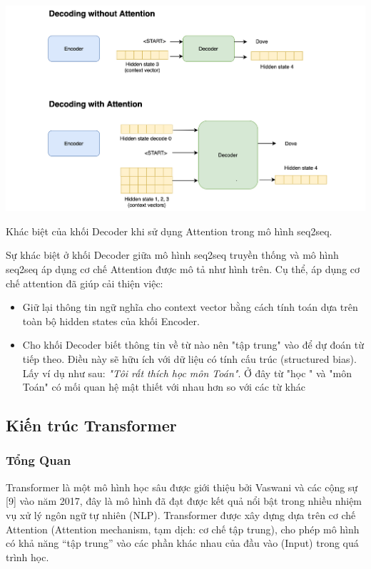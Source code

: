 \documentclass[a4paper, 12pt, openany]{book}
\begin{document}
\begin{minipage}{\linewidth}
    \captionsetup{type=figure}
    \centering
    \includegraphics[width=\linewidth]{./assets/images/decoding-attention.png}
    \caption{Khác biệt của khối Decoder khi sử dụng Attention trong mô hình \ac{seq2seq}.}
\end{minipage}
\vspace{0.5cm}

Sự khác biệt ở khối Decoder giữa mô hình \ac{seq2seq} truyền thống và mô hình \ac{seq2seq} áp dụng cơ chế Attention được mô tả như hình trên.
Cụ thể, áp dụng cơ chế attention đã giúp cải thiện việc:

\begin{itemize}
    \item Giữ lại thông tin ngữ nghĩa cho context vector bằng cách tính toán dựa trên toàn bộ hidden states của khối Encoder.
    \item Cho khối Decoder biết thông tin về từ nào nên "tập trung" vào để dự đoán từ tiếp theo. Điều này sẽ hữu ích với dữ liệu có tính cấu trúc (structured bias). Lấy ví dụ như sau: 
    \textit{"Tôi rất thích học môn Toán"}. Ở đây từ "học " và "môn Toán" có mối quan hệ mật thiết với nhau hơn so với các từ khác
\end{itemize}

\subsection{Kiến trúc Transformer}
\subsubsection{Tổng Quan}

Transformer\cite{Wolf2019HuggingFacesTS} là một mô hình học sâu được giới thiệu bởi Vaswani và các cộng sự [9]
vào năm 2017, đây là mô hình đã đạt được kết quả nổi bật trong nhiều nhiệm vụ xử lý
ngôn ngữ tự nhiên (NLP). Transformer được xây dựng dựa trên cơ chế Attention
(Attention mechanism, tạm dịch: cơ chế tập trung), cho phép mô hình có khả năng “tập
trung” vào các phần khác nhau của đầu vào (Input) trong quá trình học.
\end{document}

